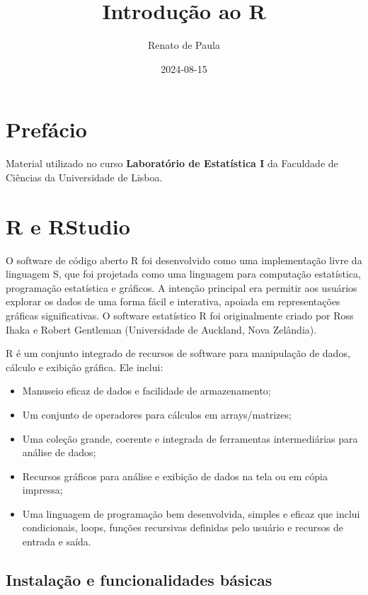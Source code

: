 \documentclass[
]{book}
\title{Introdução ao R}
\author{Renato de Paula}
\date{2024-08-15}
\begin{document}
\maketitle

{
\setcounter{tocdepth}{1}
\tableofcontents
}
\chapter{Prefácio}\label{prefuxe1cio}

Material utilizado no curso \textbf{Laboratório de Estatística I} da Faculdade de Ciências da Universidade de Lisboa.

\chapter{R e RStudio}\label{r-e-rstudio}

O software de código aberto R foi desenvolvido como uma implementação livre da linguagem S, que foi projetada como uma linguagem para computação estatística, programação estatística e gráficos. A intenção principal era permitir aos usuários explorar os dados de uma forma fácil e interativa, apoiada em representações gráficas significativas. O software estatístico R foi originalmente criado por Ross Ihaka e Robert Gentleman (Universidade de Auckland, Nova Zelândia).

R é um conjunto integrado de recursos de software para manipulação de dados, cálculo e exibição gráfica. Ele inclui:

\begin{itemize}
\item
  Manuseio eficaz de dados e facilidade de armazenamento;
\item
  Um conjunto de operadores para cálculos em arrays/matrizes;
\item
  Uma coleção grande, coerente e integrada de ferramentas intermediárias para análise de dados;
\item
  Recursos gráficos para análise e exibição de dados na tela ou em cópia impressa;
\item
  Uma linguagem de programação bem desenvolvida, simples e eficaz que inclui condicionais, loops, funções recursivas definidas pelo usuário e recursos de entrada e saída.
\end{itemize}

\section{Instalação e funcionalidades básicas}\label{instalauxe7uxe3o-e-funcionalidades-buxe1sicas}
\end{document}
